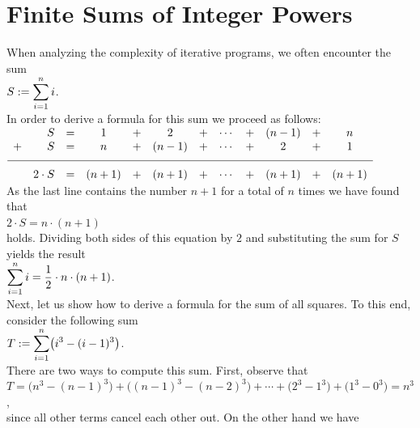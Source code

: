 \section{Finite Sums of Integer Powers}
When analyzing the complexity of iterative programs, we often encounter the sum
\\[0.2cm]
\hspace*{1.3cm}
$\displaystyle S := \sum\limits_{i=1}^n i$.
\\[0.2cm]
In order to derive a formula for this sum we proceed as follows:
\\[0.2cm]
\hspace*{1.3cm}
$
\begin{array}{lrcccccccccc}
    & S & = & 1 & + &   2   & + & \cdots & + & (n-1)& + & n  \\
  + & S & = & n & + & (n-1) & + & \cdots & + &   2  & + & 1  \\[0.2cm]
  \hline\\[-0.2cm]
    & 2\cdot S & = & (n+1) & + & (n+1) & + & \cdots & + & (n+1) & + & (n+1)
\end{array}
$
\\[0.2cm]
As the last line contains the number $n+1$ for a total of $n$ times we have found that
\\[0.2cm]
\hspace*{1.3cm}
$2 \cdot S = n \cdot (n+1)$
\\[0.2cm]
holds.  Dividing both sides of this equation by $2$ and substituting the sum for $S$ yields the result
\\[0.2cm]
\hspace*{1.3cm}
$\displaystyle\sum\limits_{i=1}^n i = \frac{1}{2} \cdot n \cdot (n+1)$.
\\[0.2cm]
Next, let us show how to derive a formula for the sum of all squares.  To this end, consider the following sum
\\[0.2cm]
\hspace*{1.3cm}
$\displaystyle T := \sum\limits_{i=1}^n \bigl(i^3 - (i-1)^3\bigr)$.
\\[0.2cm]
There are two ways to compute this sum.  First, observe that 
\\[0.2cm]
\hspace*{1.3cm}
$T = \bigl(n^3 - (n-1)^3\bigr) + \bigl((n-1)^3 - (n-2)^3\bigr) + \cdots +
    \bigl(2^3 - 1^3\bigr) + \bigl(1^3 - 0^3\bigr) = n^3$,
\\[0.2cm]
since all other terms cancel each other out.  On the other hand we have
\\[0.2cm]
\hspace*{1.3cm}
